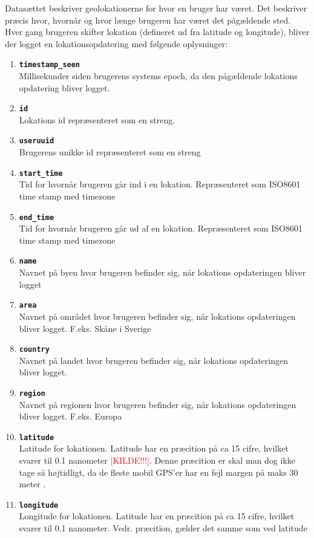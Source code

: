 Datasættet beskriver geolokationerne for hvor en bruger har været. Det beskriver præcis hvor, hvornår og hvor længe brugeren har været det pågældende sted. Hver gang brugeren skifter lokation (defineret ud fra latitude og longitude), bliver der logget en lokationsopdatering med følgende oplysninger:
\begin{enumerate}
\item \texttt{\textbf{timestamp\_seen}}\\Millisekunder siden brugerens systems epoch, da den pågældende lokations opdatering bliver logget. 
\item \texttt{\textbf{id}}\\Lokations id repræsenteret som en streng. 
\item \texttt{\textbf{useruuid}}\\Brugerens unikke id repræsenteret som en streng
\item \texttt{\textbf{start\_time}}\\Tid for hvornår brugeren går ind i en lokation. Repræsenteret som ISO8601 time stamp med timezone
\item \texttt{\textbf{end\_time}}\\Tid for hvornår brugeren går ud af en lokation. Repræsenteret som ISO8601 time stamp med timezone
\item \texttt{\textbf{name}}\\Navnet på byen hvor brugeren befinder sig, når lokations opdateringen bliver logget
\item \texttt{\textbf{area}}\\Navnet på området hvor brugeren befinder sig, når lokations opdateringen bliver logget. F.eks. Skåne i Sverige
\item \texttt{\textbf{country}}\\Navnet på landet hvor brugeren befinder sig, når lokations opdateringen bliver logget.
\item \texttt{\textbf{region}}\\Navnet på regionen hvor brugeren befinder sig, når lokations opdateringen bliver logget. F.eks. Europa
\item \texttt{\textbf{latitude}}\\Latitude for lokationen. Latitude har en præcition på ca 15 cifre, hvilket svarer til 0.1 nanometer \textcolor{red}{[KILDE!!!]}. Denne præcition er skal man dog ikke tage så højtidligt, da de fleste mobil GPS'er har en fejl margen på maks 30 meter \cite{NAV:8292634}.  
\item \texttt{\textbf{longitude}}\\Longitude for lokationen. Latitude har en præcition på ca 15 cifre, hvilket svarer til 0.1 nanometer. Vedr. præcition, gælder det samme som ved latitude

\end{enumerate}
